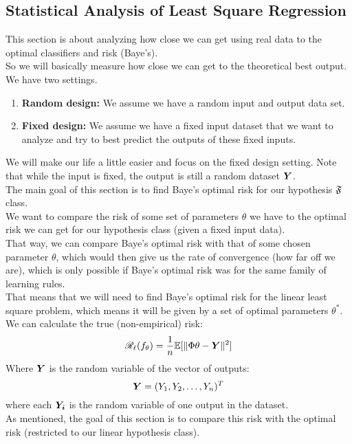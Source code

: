 \documentclass[12pt]{article}
\begin{document}
\subsection*{Statistical Analysis of Least Square
Regression}

This section is about analyzing how close we can
get using real data to the optimal classifiers
and risk (Baye's). \\

So we will basically measure how close we
can get to the theoretical best output. \\

We have two settings. \\
\begin{enumerate}
    \item 
    \textbf{Random design:} 
    We assume we have a random
    input and output data set.
    \item 
    \textbf{Fixed design:} 
    We assume we have a fixed input dataset that
    we want to analyze and try to best predict the 
    outputs of these fixed inputs. 
\end{enumerate}

We will make our life a little easier and
focus on the fixed design setting.
Note that while the input is fixed,
the output is still a random dataset $\boldsymbol{Y}$. \\

The main goal of this section is to
find Baye's optimal risk for our hypothesis
$\mathfrak{F}$ class. \\
We want to compare the risk of some
set of parameters $\theta$ we have to
the optimal risk we can get
for our hypothesis class (given a fixed
input data). \\
That way, we can compare Baye's optimal risk
with that of some chosen parameter $\theta$,
which would then give us the rate of convergence
(how far off we are),
which is only possible if Baye's optimal risk
was for the same family of learning rules. \\
That means that we will need to find
Baye's optimal risk for the linear least square
problem, which means it will be given
by a set of optimal parameters $\theta^*$. \\

We can calculate the true (non-empirical)
risk:
\[ \mathscr{R}_{\ell}{}(f_\theta) = 
\dfrac{1}{n}\mathbb{E}[\|\Phi \theta - \boldsymbol{Y}\|^2] \]
Where $\boldsymbol{Y}$
is the random variable of the vector of outputs:
\[ \boldsymbol{Y} = (Y_1,Y_2, \dots, Y_n)^T \]
where each $\boldsymbol{Y_i}$
is the random variable of one output in the dataset. \\
As mentioned, the goal of this section
is to compare this risk with the optimal risk
(restricted to our linear hypothesis class). \\
\end{document}
